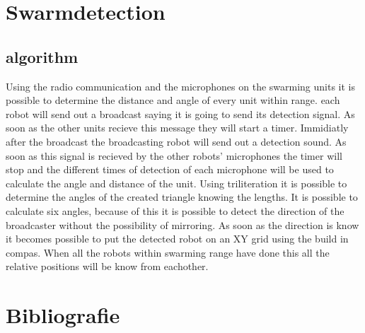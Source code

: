 \documentclass[10pt,a4paper]{article}
\begin{document}
\section{Swarmdetection}
\subsection{algorithm}
Using the radio communication and the microphones on the swarming units it is possible to determine the distance and angle of every unit within range. each robot will send out a broadcast saying it is going to send its detection signal. As soon as the other units recieve this message they will start a timer. Immidiatly after the broadcast the broadcasting robot will send out a detection sound. As soon as this signal is recieved by the other robots' microphones the timer will stop and the different times of detection of each microphone will be used to calculate the angle and distance of the unit.
Using triliteration it is possible to determine the angles of the created triangle knowing the lengths. It is possible to calculate six angles, because of this it is possible to detect the direction of the broadcaster without the possibility of mirroring. As soon as the direction is know it becomes possible to put the detected robot on an XY grid using the build in compas. When all the robots within swarming range have done this all the relative positions will be know from eachother.
\newpage

\section{Bibliografie}


\end{document}
